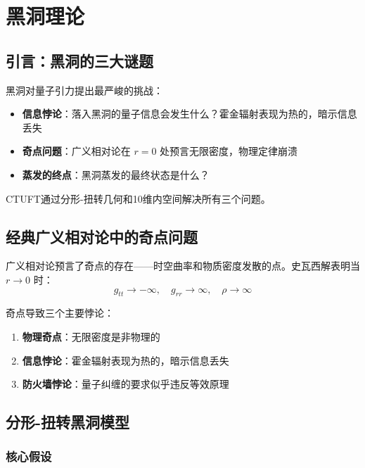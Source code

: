 \section{黑洞理论}
\label{sec:bh-backup}

\subsection{引言：黑洞的三大谜题}

黑洞对量子引力提出最严峻的挑战：
\begin{itemize}
    \item \textbf{信息悖论}：落入黑洞的量子信息会发生什么？霍金辐射表现为热的，暗示信息丢失
    \item \textbf{奇点问题}：广义相对论在 $r = 0$ 处预言无限密度，物理定律崩溃
    \item \textbf{蒸发的终点}：黑洞蒸发的最终状态是什么？
\end{itemize}

CTUFT通过分形-扭转几何和10维内空间解决所有三个问题。

\subsection{经典广义相对论中的奇点问题}

广义相对论预言了奇点的存在——时空曲率和物质密度发散的点。史瓦西解表明当 $r \to 0$ 时：
\begin{equation}
    g_{tt} \to -\infty, \quad g_{rr} \to \infty, \quad \rho \to \infty
\end{equation}

奇点导致三个主要悖论：
\begin{enumerate}
    \item \textbf{物理奇点}：无限密度是非物理的
    \item \textbf{信息悖论}：霍金辐射表现为热的，暗示信息丢失
    \item \textbf{防火墙悖论}：量子纠缠的要求似乎违反等效原理
\end{enumerate}

\subsection{分形-扭转黑洞模型}

\subsubsection{核心假设}

